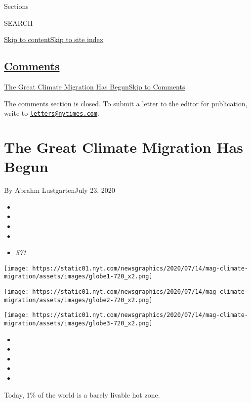 Sections

SEARCH

\protect\hyperlink{site-content}{Skip to
content}\protect\hyperlink{site-index}{Skip to site index}

\hypertarget{comments}{%
\subsection{\texorpdfstring{\protect\hyperlink{commentsContainer}{Comments}}{Comments}}\label{comments}}

\href{}{The Great Climate Migration Has Begun}\href{}{Skip to Comments}

The comments section is closed. To submit a letter to the editor for
publication, write to
\href{mailto:letters@nytimes.com}{\nolinkurl{letters@nytimes.com}}.

\hypertarget{the-great-climate-migration-has-begun}{%
\section{The Great Climate Migration Has
Begun}\label{the-great-climate-migration-has-begun}}

By Abrahm LustgartenJuly 23, 2020

\begin{itemize}
\item
\item
\item
\item
\item
  \emph{571}
\end{itemize}

\texttt{[image: https://static01.nyt.com/newsgraphics/2020/07/14/mag-climate-migration/assets/images/globe1-720\_x2.png]}

\texttt{[image: https://static01.nyt.com/newsgraphics/2020/07/14/mag-climate-migration/assets/images/globe2-720\_x2.png]}

\texttt{[image: https://static01.nyt.com/newsgraphics/2020/07/14/mag-climate-migration/assets/images/globe3-720\_x2.png]}

\begin{itemize}
\item
\item
\item
\item
\item
\end{itemize}

Today, 1\% of the world is a barely livable hot zone.

